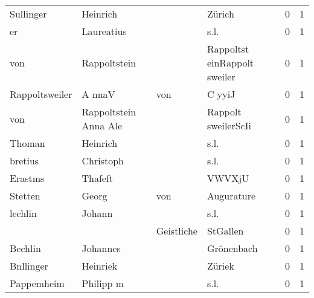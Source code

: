\begin{tabular}{llllrr}
                Sullinger &                           Heinrich &             &                                      Zürich &          0 &         1 \\
                       er &                         Laureatius &             &                                        s.l. &          0 &         1 \\
                      von &                       Rappoltstein &             &                Rappoltst einRappolt sweiler &          0 &         1 \\
           Rappoltsweiler &                             A nnaV &         von &                                      C yyiJ &          0 &         1 \\
                      von &              Rappoltstein Anna Ale &             &                         Rappolt sweilerScIi &          0 &         1 \\
                   Thoman &                           Heinrich &             &                                        s.l. &          0 &         1 \\
                  bretius &                          Christoph &             &                                        s.l. &          0 &         1 \\
                  Erastms &                            Thafeft &             &                                      VWVXjU &          0 &         1 \\
                  Stetten &                              Georg &         von &                                  Augurature &          0 &         1 \\
                  lechlin &                             Johann &             &                                        s.l. &          0 &         1 \\
                          &                                    &  Geistliche &                                    StGallen &          0 &         1 \\
                  Bechlin &                           Johannes &             &                                  Grönenbach &          0 &         1 \\
                Bnllinger &                           Heinriek &             &                                      Züriek &          0 &         1 \\
               Pappemheim &                          Philipp m &             &                                        s.l. &          0 &         1 \\

\end{tabular}
